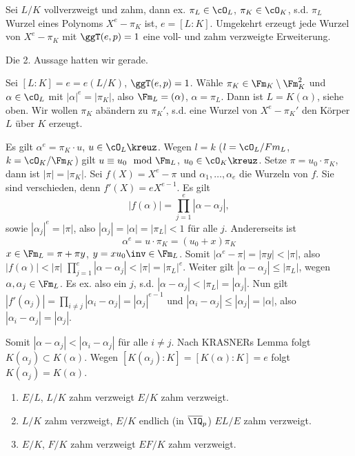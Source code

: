\renewcommand{\lecdate}{10.02.2015}

\begin{Fakt}
 Sei $L/K$ vollverzweigt und zahm, dann ex. $\pi_L\in\cO_L$, $\pi_K\in\cO_K$, s.d. $\pi_L$ Wurzel eines Polynoms $X^e-\pi_K$ ist, $e=[L:K]$. Umgekehrt erzeugt jede Wurzel von $X^e-\pi_K$ mit $\ggT(e,p)=1$ eine voll- und zahm verzweigte Erweiterung. 
\end{Fakt}

\begin{Beweis}
 Die 2. Aussage hatten wir gerade.
 
 Sei $[L:K]=e=e(L/K)$, $\ggT(e,p)=1$.
 Wähle $\pi_K\in\Fm_K\setminus\Fm_K^2$ und $\alpha\in\cO_L$ mit $|\alpha|^e=|\pi_K|$, also $\Fm_L=(\alpha)$, $\alpha=\pi_L$. Dann ist $L=K(\alpha)$, siehe oben. Wir wollen $\pi_K$ abändern zu $\pi_K'$, s.d. eine Wurzel von $X^e-\pi_K'$ den Körper $L$ über $K$ erzeugt.
 
 Es gilt $\alpha^e=\pi_K\cdot u$, $u\in\cO_L\kreuz$. Wegen $l=k$ ($l=\cO_L/Fm_L$, $k=\cO_K/\Fm_K$) gilt $u\equiv u_0 \mod{\Fm_L}$, $u_0\in\cO_K\kreuz$. Setze $\pi=u_0\cdot \pi_K$, dann ist $|\pi|=|\pi_K|$. Sei $f(X)=X^e-\pi$ und $\alpha_1,\ldots,\alpha_e$ die Wurzeln von $f$. Sie sind verschieden, denn $f'(X)=eX^{e-1}$. Es gilt \[|f(\alpha)|=\prod_{j=1}^e |\alpha-\alpha_j|, \]
 sowie $|\alpha_j|^e=|\pi|$, also $|\alpha_j|=|\alpha|=|\pi_L|<1$ für alle $j$. Andererseits ist
 \[ \alpha^e=u\cdot \pi_K=(u_0+x)\pi_K\]
$x\in\Fm_L=\pi+\pi y$, $y=xu_0\inv\in\Fm_L$. Somit $|\alpha^e-\pi|=|\pi y|<|\pi|$, also $|f(\alpha)|<|\pi|$ \folge $\prod_{j=1}^e |\alpha-\alpha_j|<|\pi|=|\pi_L|^e$. Weiter gilt $|\alpha-\alpha_j|\leq |\pi_L|$, wegen $\alpha,\alpha_j\in\Fm_L$. Es ex. also ein $j$, s.d. $|\alpha-\alpha_j|<|\pi_L|=|\alpha_j|$. Nun gilt $|f'(\alpha_j)|=\prod_{i\neq j} |\alpha_i-\alpha_j|=|\alpha_j|^{e-1}$ und $|\alpha_i-\alpha_j|\leq |\alpha_j|=|\alpha|$, also $|\alpha_i-\alpha_j|=|\alpha_j|$.

Somit $|\alpha-\alpha_j|<|\alpha_i-\alpha_j|$ für alle $i\neq j$. Nach KRASNERs Lemma folgt $K(\alpha_j)\subset K(\alpha)$. Wegen $[K(\alpha_j):K]=[K(\alpha):K]=e$ folgt $K(\alpha_j)=K(\alpha)$.
\end{Beweis}

\begin{Fakt}
 \begin{enumerate}
  \item $E/L$, $L/K$ zahm verzweigt \folge $E/K$ zahm verzweigt.
  \item $L/K$ zahm verzweigt, $E/K$ endlich (in $\overline\IQ_p$) \folge $EL/E$ zahm verzweigt.
  \item $E/K$, $F/K$ zahm verzweigt \folge $EF/K$ zahm verzweigt.
 \end{enumerate}
\end{Fakt}

